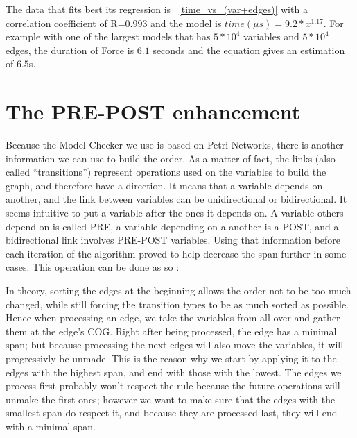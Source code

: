 \documentclass[12pt]{report}
\begin{document}
The data that fits best its regression is ~\ref{time_vs_(var+edges)} with a correlation coefficient of R=0.993 and the model is $time({\mu}s)= {9.2}*x^{1.17}$. For example with one of the largest models that has $5*10^4$ variables and $5*10^4$ edges, the duration of Force is $6.1$ seconds and the equation gives an estimation of $6.5$s.

\section{The PRE-POST enhancement}

Because the Model-Checker we use is based on Petri Networks, there is another information we can use to build the order. As a matter of fact, the links (also called \enquote{transitions}) represent operations used on the variables to build the graph, and therefore have a direction. It means that a variable depends on another, and the link between variables can be unidirectional or bidirectional. It seems intuitive to put a variable after the ones it depends on. A variable others depend on is called PRE, a variable depending on a another is a POST, and a bidirectional link involves PRE-POST variables. Using that information before each iteration of the algorithm proved to help decrease the span further in some cases.
This operation can be done as so :

\begin{algorithm}
\begin{algorithmic}[1]
  \EndFor
\EndFunction
\end{algorithmic}
\end{algorithm}

In theory, sorting the edges at the beginning allows the order not to be too much changed, while still forcing the transition types to be as much sorted as possible. Hence when processing an edge, we take the variables from all over and gather them at the edge's COG. Right after being processed, the edge has a minimal span; but because processing the next edges will also move the variables, it will progressivly be unmade. This is the reason why we start by applying it to the edges with the highest span, and end with those with the lowest. The edges we process first probably won't respect the rule because the future operations will unmake the first ones; however we want to make sure that the edges with the smallest span do respect it, and because they are processed last, they will end with a minimal span.
\end{document}
